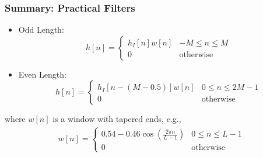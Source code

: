 \documentclass{beamer}
\begin{document}
\begin{frame}
  \frametitle{Summary: Practical Filters}
  \begin{itemize}
  \item Odd Length:
    \[
    h[n] = \begin{cases}
      h_I[n]w[n] & -M\le n\le M\\
      0 & \mbox{otherwise}
    \end{cases}
    \]
  \item Even Length:
    \[
    h[n] = \begin{cases}
      h_I\left[n-(M-0.5)\right]w[n] & 0\le n\le 2M-1\\
      0 & \mbox{otherwise}
    \end{cases}
    \]
  \end{itemize}
  where $w[n]$ is a window with tapered ends, e.g.,
  \begin{align*}
    w[n] = \begin{cases}
      0.54-0.46\cos\left(\frac{2\pi n}{L-1}\right) & 0\le n\le L-1\\
      0 &\mbox{otherwise}\end{cases}
  \end{align*}
\end{frame}
\end{document}
